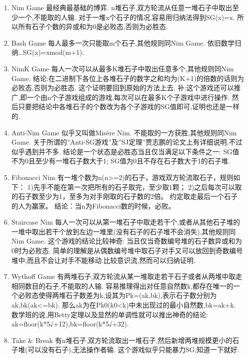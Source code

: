 \begin{enumerate}
	\item Nim Game
	最经典最基础的博弈.
	n堆石子,双方轮流从任意一堆石子中取出至少一个,不能取的人输.
	对于一堆x个石子的情况,容易用归纳法得到SG(x)=x.
	所以所有石子个数的异或和为0是必败态,否则为必胜态.
	
	\item Bash Game
	每人最多一次只能取m个石子,其他规则同Nim Game.
	依旧数学归纳…SG(x)=xmod(m+1).
	
	\item NimK Game
	每人一次可以从最多K堆石子中取出任意多个,其他规则同Nim Game.
	结论:在二进制下各位上各堆石子的数字之和均为(K+1)的倍数的话则为必败态,否则为必胜态.
	这个证明要回到原始的方法上去.
	补:这个游戏还可以推广,即一个由n个子游戏组成的游戏,每次可以在最多K个子游戏中进行操作.
	然后只要把结论中各堆石子的个数改为各个子游戏的SG值即可,证明也还是一样的.
	
	\item Anti-Nim Game
	似乎又叫做Misère Nim.
	不能取的一方获胜,其他规则同Nim Game.
	关于所谓的”Anti-SG游戏”及”SJ定理”贾志鹏的论文上有详细说明,不过似乎遇到并不多.
	结论是一个状态是必胜态当且仅当满足以下条件之一:
	SG值不为0且至少有一堆石子数大于1;
	SG值为0且不存在石子数大于1的石子堆.
	
	\item Fibonacci Nim
	有一堆个数为n(n>=2)的石子，游戏双方轮流取石子，规则如下：
	1)先手不能在第一次把所有的石子取完，至少取1颗；
	2)之后每次可以取的石子数至少为1，至多为对手刚取的石子数的2倍。
	约定取走最后一个石子的人为赢家。
	结论：当n为Fibonacci数的时候，必败。
	
	\item Staircase Nim
	每人一次可以从第一堆石子中取走若干个,或者从其他石子堆的一堆中取出若干个放到左边一堆里(没有石子的石子堆不会消失),其他规则同Nim Game.
	这个游戏的结论比较神奇:
	当且仅当奇数编号堆的石子数异或和为0时为必败态.
	简单的理解是从偶数编号堆中取石子对手又可以放回到奇数编号堆中,而且不会让对手不能移动.比较意识流,然而可以归纳证明.
	
	\item Wythoff Game
	有两堆石子,双方轮流从某一堆取走若干石子或者从两堆中取走相同数目的石子,不能取的人输.
	容易推理得出对任意自然数k,都存在唯一的一个必败态使得两堆石子数差为k,设其为Pk=(ak,bk),表示石子数分别为ak,bk(ak<=bk).
	那么ak为在Pk0(k0<k)中未出现过的最小自然数,bk=ak+k.
	数学班的说,用Betty定理以及显然的单调性就可以推出神奇的结论:
	ak=floor(k*5√+12),bk=floor(k*5√+32).
	
	\item Take \& Break
	有n堆石子,双方轮流取出一堆石子,然后新增两堆规模更小的石子堆(可以没有石子),无法操作者输.
	这个游戏似乎只能暴力SG,知道一下就好.
	

\end{enumerate}
